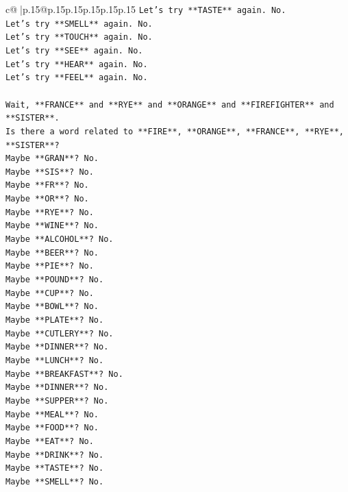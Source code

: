\documentclass{article}
\begin{document}
{\begin{supertabular}{c@{$\;$}|p{.15\linewidth}@{}p{.15\linewidth}p{.15\linewidth}p{.15\linewidth}p{.15\linewidth}p{.15\linewidth}}
{{{\texttt{Let's try **TASTE** again. No.} \\
\texttt{Let's try **SMELL** again. No.} \\
\texttt{Let's try **TOUCH** again. No.} \\
\texttt{Let's try **SEE** again. No.} \\
\texttt{Let's try **HEAR** again. No.} \\
\texttt{Let's try **FEEL** again. No.} \\
\\ 
\texttt{Wait, **FRANCE** and **RYE** and **ORANGE** and **FIREFIGHTER** and **SISTER**.} \\
\texttt{Is there a word related to **FIRE**, **ORANGE**, **FRANCE**, **RYE**, **SISTER**?} \\
\texttt{Maybe **GRAN**? No.} \\
\texttt{Maybe **SIS**? No.} \\
\texttt{Maybe **FR**? No.} \\
\texttt{Maybe **OR**? No.} \\
\texttt{Maybe **RYE**? No.} \\
\texttt{Maybe **WINE**? No.} \\
\texttt{Maybe **ALCOHOL**? No.} \\
\texttt{Maybe **BEER**? No.} \\
\texttt{Maybe **PIE**? No.} \\
\texttt{Maybe **POUND**? No.} \\
\texttt{Maybe **CUP**? No.} \\
\texttt{Maybe **BOWL**? No.} \\
\texttt{Maybe **PLATE**? No.} \\
\texttt{Maybe **CUTLERY**? No.} \\
\texttt{Maybe **DINNER**? No.} \\
\texttt{Maybe **LUNCH**? No.} \\
\texttt{Maybe **BREAKFAST**? No.} \\
\texttt{Maybe **DINNER**? No.} \\
\texttt{Maybe **SUPPER**? No.} \\
\texttt{Maybe **MEAL**? No.} \\
\texttt{Maybe **FOOD**? No.} \\
\texttt{Maybe **EAT**? No.} \\
\texttt{Maybe **DRINK**? No.} \\
\texttt{Maybe **TASTE**? No.} \\
\texttt{Maybe **SMELL**? No.} \\
}}}
\end{supertabular}}
\end{document}
